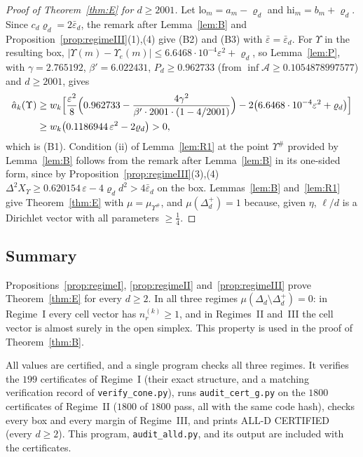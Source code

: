 \documentclass[11pt]{amsart}
\theoremstyle{definition}
\theoremstyle{remark}
\numberwithin{equation}{section}
\begin{document}
\begin{proof}[Proof of Theorem~\ref{thm:E} for $d\ge2001$]
Let $\mathrm{lo}_m=a_m-\varrho_d$ and $\mathrm{hi}_m=b_m+\varrho_d$. Since $c_d\varrho_d=2\bar\varepsilon_d$, the remark after
Lemma~\ref{lem:B} and Proposition~\ref{prop:regimeIII}(1),(4) give (B2) and (B3) with $\bar\varepsilon=\bar\varepsilon_d$. For
$\Upsilon$ in the resulting box, $|\Upsilon(m)-\Upsilon_e(m)|\le6.6468\cdot10^{-4}\varepsilon^2+\varrho_d$, so
Lemma~\ref{lem:P}, with $\gamma=2.765192$, $\beta'=6.022431$, $P_d\ge0.962733$ (from $\inf\mathcal A\ge0.1054878997577$)
and $d\ge2001$, gives
\begin{align*}
\hat a_k(\Upsilon)&\ge w_k\Bigl[\frac{\varepsilon^2}8\Bigl(0.962733-\frac{4\gamma^2}{\beta'\cdot2001\cdot(1-4/2001)}\Bigr)
-2\bigl(6.6468\cdot10^{-4}\varepsilon^2+\varrho_d\bigr)\Bigr]\\
&\ge w_k\bigl(0.1186944\,\varepsilon^2-2\varrho_d\bigr)>0,
\end{align*}
which is (B1). Condition (ii) of Lemma~\ref{lem:R1} at the point $\Upsilon^\#$ provided by Lemma~\ref{lem:B} follows from
the remark after Lemma~\ref{lem:B} in its one-sided form, since by Proposition~\ref{prop:regimeIII}(3),(4)
$\Delta^2X_\Upsilon\ge0.620154\,\varepsilon-4\varrho_dd^2>4\bar\varepsilon_d$ on the box. Lemmas~\ref{lem:B}
and~\ref{lem:R1} give Theorem~\ref{thm:E} with $\mu=\mu_{\Upsilon^\#}$, and $\mu(\Delta_d^+)=1$ because, given $\eta$,
$\ell/d$ is a Dirichlet vector with all parameters $\ge\frac14$.
\end{proof}

\subsection{Summary}\label{subsec:conesummary}
Propositions~\ref{prop:regimeI}, \ref{prop:regimeII} and~\ref{prop:regimeIII} prove Theorem~\ref{thm:E} for every $d\ge2$. In
all three regimes $\mu(\Delta_d\setminus\Delta_d^+)=0$: in Regime~I every cell vector has $n^{(k)}_r\ge1$, and in
Regimes~II and~III the cell vector is almost surely in the open simplex. This property is used in the proof of
Theorem~\ref{thm:B}.

All values are certified, and a single program checks all three regimes. It verifies the $199$ certificates of
Regime~I (their exact structure, and a matching verification record of \texttt{verify\_cone.py}), runs
\texttt{audit\_cert\_g.py} on the $1800$ certificates of Regime~II ($1800$ of $1800$ pass, all with the same code hash),
checks every box and every margin of Regime~III, and prints ALL-D CERTIFIED (every $d\ge2$). This program,
\texttt{audit\_alld.py}, and its output are included with the certificates.
\end{document}
